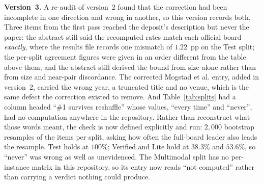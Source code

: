 \documentclass[11pt]{article}
\begin{document}
\medskip\noindent
\textbf{Version~3.} A re-audit of version~2 found that the correction had been incomplete in one
direction and wrong in another, so this version records both. Three items from the first pass reached
the deposit's description but never the paper: the abstract still said the recomputed rates match each
official board \emph{exactly}, where the results file records one mismatch of $1.22$~pp on the Test
split; the per-split agreement figures were given in an order different from the table above them; and
the abstract still derived the bound from size alone rather than from size and near-pair discordance.
The corrected Mogstad et al. entry, added in version~2, carried the wrong year, a truncated title and
no venue, which is the same defect the correction existed to remove. And Table~\ref{tab:splits} had a
column headed ``\#1 survives reshuffle'' whose values, ``every time'' and ``never'', had no computation
anywhere in the repository. Rather than reconstruct what those words meant, the check is now defined
explicitly and run: $2{,}000$ bootstrap resamples of the items per split, asking how often the
full-board leader also leads the resample. Test holds at $100\%$; Verified and Lite hold at $38.3\%$
and $53.6\%$, so ``never'' was wrong as well as unevidenced. The Multimodal split has no per-instance
matrix in this repository, so its entry now reads ``not computed'' rather than carrying a verdict
nothing could produce.
\end{document}

